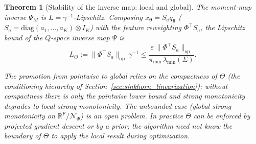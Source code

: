 \documentclass[11pt,a4paper]{article}
\newtheorem{theorem}{Theorem}[section]
\theoremstyle{remark}
\begin{document}
\begin{theorem}[Stability of the inverse map: local and global]
The moment-map inverse $\Psi_M$ is $L=\gamma^{-1}$-Lipschitz. Composing
$x_{\bm{\theta}}=S_a q_{\bm{\theta}}$
($S_a=\mathrm{diag}(a_1,\dots,a_K)\otimes I_K$) with the feature reweighting
$\Phi^{\top}S_a$, the Lipschitz bound of the $Q$-space inverse map $\Psi$ is
\[
L_\Theta:=\|\Phi^{\top}S_a\|_{\mathrm{op}}\,\gamma^{-1}\le\frac{\varepsilon\,\|\Phi^{\top}S_a\|_{\mathrm{op}}}{\pi_{\min}\,\lambda_{\min}(\Sigma)}.
\]

The promotion from pointwise to global relies on the compactness of $\Theta$ (the
conditioning hierarchy of Section~\ref{sec:sinkhorn_linearization}); without compactness
there is only the pointwise lower bound and strong monotonicity degrades to local strong monotonicity. The
unbounded case (global strong monotonicity on $\mathbb{R}^F/\mathcal{N}_\Phi$) is an open
problem. In practice $\Theta$ can be enforced by projected gradient descent or by a prior;
the algorithm need not know the boundary of $\Theta$ to apply the local result during
optimization.
\end{theorem}
\end{document}
